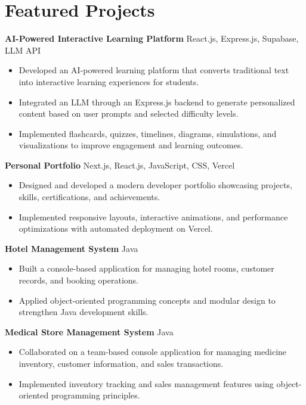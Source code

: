 \section*{Featured Projects}

\textbf{AI-Powered Interactive Learning Platform} \hfill React.js, Express.js, Supabase, LLM API
\begin{itemize}[leftmargin=*]
    \item Developed an AI-powered learning platform that converts traditional text into interactive learning experiences for students.
    \item Integrated an LLM through an Express.js backend to generate personalized content based on user prompts and selected difficulty levels.
    \item Implemented flashcards, quizzes, timelines, diagrams, simulations, and visualizations to improve engagement and learning outcomes.
\end{itemize}

\textbf{Personal Portfolio} \hfill Next.js, React.js, JavaScript, CSS, Vercel
\begin{itemize}[leftmargin=*]
    \item Designed and developed a modern developer portfolio showcasing projects, skills, certifications, and achievements.
    \item Implemented responsive layouts, interactive animations, and performance optimizations with automated deployment on Vercel.
\end{itemize}

\textbf{Hotel Management System} \hfill Java
\begin{itemize}[leftmargin=*]
    \item Built a console-based application for managing hotel rooms, customer records, and booking operations.
    \item Applied object-oriented programming concepts and modular design to strengthen Java development skills.
\end{itemize}

\textbf{Medical Store Management System} \hfill Java
\begin{itemize}[leftmargin=*]
    \item Collaborated on a team-based console application for managing medicine inventory, customer information, and sales transactions.
    \item Implemented inventory tracking and sales management features using object-oriented programming principles.
\end{itemize}